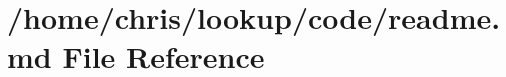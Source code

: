 \hypertarget{readme_8md}{\section{/home/chris/lookup/code/readme.md File Reference}
\label{readme_8md}
}
